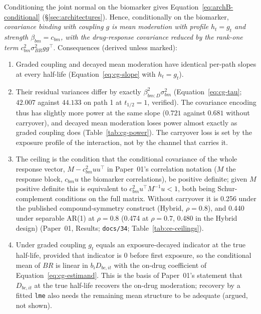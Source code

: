 \documentclass[11pt]{article}
\newcommand{\code}[1]{\texttt{#1}}
\begin{document}
Conditioning the joint normal on the biomarker gives
Equation~\eqref{eq:archB-conditional} (\S\ref{sec:architectures}).
Hence, conditionally on the biomarker,
\emph{covariance binding with coupling $g$ is mean moderation with
profile $h_t = g_t$ and strength $\beta_{bm} = c_{bm}$, with the
drug-response covariance reduced by the rank-one term
$c_{bm}^2\sigma_{BR}^2 g g^\top$}. Consequences (derived unless
marked):
\begin{enumerate}[label=(\roman*), itemsep=2pt]
\item Graded coupling and decayed mean moderation have identical
  per-path slopes at every half-life (Equation~\eqref{eq:cg-slope} with
  $h_t = g_t$).
\item Their residual variances differ by exactly
  $\beta_{bm:D}^2\sigma_{bm}^2$ (Equation~\eqref{eq:cg-tau}; $42.007$
  against $44.133$ on path 1 at $t_{1/2} = 1$, verified). The
  covariance encoding thus has slightly more power at the same slope
  ($0.721$ against $0.681$ without carryover), and decayed mean
  moderation loses power almost exactly as graded coupling does
  (Table~\ref{tab:cg-power}). The carryover loss is set by the
  exposure profile of the interaction, not by the channel that carries
  it.
\item The ceiling is the condition that the conditional covariance of
  the whole response vector, $M - c_{bm}^2 uu^\top$ in Paper~01's
  correlation notation ($M$ the response block, $c_{bm}u$ the biomarker
  correlations), be positive definite; given $M$ positive definite this
  is equivalent to $c_{bm}^2 u^\top M^{-1}u < 1$, both being
  Schur-complement conditions on the full matrix. Without carryover it
  is 0.256 under the published compound-symmetry construct (Hybrid,
  $\rho = 0.8$), and 0.440 under separable AR(1) at $\rho = 0.8$
  (0.474 at $\rho = 0.7$, 0.480 in the Hybrid design) (Paper~01,
  Results; \code{docs/34}; Table~\ref{tab:ce-ceilings}).
\item Under graded coupling $g_t$ equals an exposure-decayed indicator
  at the true half-life, provided that indicator is $0$ before first
  exposure, so the conditional mean of $BR$ is linear in
  $b_i D_{bc,it}$ with the on-drug coefficient of
  Equation~\eqref{eq:cg-estimand}. This is the basis of Paper~01's
  statement that $D_{bc,it}$ at the true half-life recovers the
  on-drug moderation; recovery by a fitted \code{lme} also needs the
  remaining mean structure to be adequate (argued, not shown).
\end{enumerate}
\end{document}
